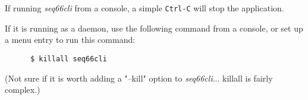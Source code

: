    If running \textsl{seq66cli} from a console, a simple
   \texttt{Ctrl-C} will stop the application.

   If it is running as a daemon, use the following command from a console,
   or set up a menu entry to run this command:

   \begin{verbatim}
      $ killall seq66cli
   \end{verbatim}

   (Not sure if it is worth adding a "--kill" option to
   \textsl{seq66cli}... killall is fairly complex.)

